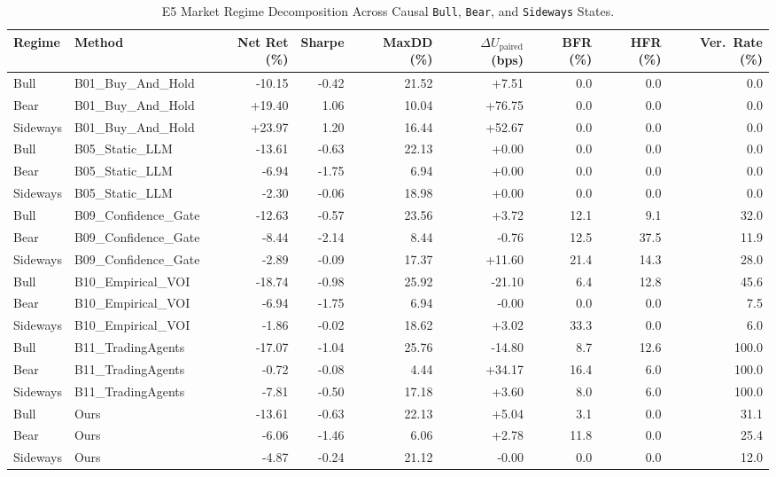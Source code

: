 \begin{table}[t]
\centering
\caption{E5 Market Regime Decomposition Across Causal \texttt{Bull}, \texttt{Bear}, and \texttt{Sideways} States.}
\label{tab:e5_market_regimes}
\footnotesize
\begin{tabular}{llrrrrrrr}
\toprule
Regime & Method & Net Ret (\%) & Sharpe & MaxDD (\%) & $\Delta U_{\text{paired}}$ (bps) & BFR (\%) & HFR (\%) & Ver.\ Rate (\%) \\
\midrule
Bull & B01\_Buy\_And\_Hold & -10.15 & -0.42 & 21.52 & +7.51 & 0.0 & 0.0 & 0.0 \\
Bear & B01\_Buy\_And\_Hold & +19.40 & 1.06 & 10.04 & +76.75 & 0.0 & 0.0 & 0.0 \\
Sideways & B01\_Buy\_And\_Hold & +23.97 & 1.20 & 16.44 & +52.67 & 0.0 & 0.0 & 0.0 \\
Bull & B05\_Static\_LLM & -13.61 & -0.63 & 22.13 & +0.00 & 0.0 & 0.0 & 0.0 \\
Bear & B05\_Static\_LLM & -6.94 & -1.75 & 6.94 & +0.00 & 0.0 & 0.0 & 0.0 \\
Sideways & B05\_Static\_LLM & -2.30 & -0.06 & 18.98 & +0.00 & 0.0 & 0.0 & 0.0 \\
Bull & B09\_Confidence\_Gate & -12.63 & -0.57 & 23.56 & +3.72 & 12.1 & 9.1 & 32.0 \\
Bear & B09\_Confidence\_Gate & -8.44 & -2.14 & 8.44 & -0.76 & 12.5 & 37.5 & 11.9 \\
Sideways & B09\_Confidence\_Gate & -2.89 & -0.09 & 17.37 & +11.60 & 21.4 & 14.3 & 28.0 \\
Bull & B10\_Empirical\_VOI & -18.74 & -0.98 & 25.92 & -21.10 & 6.4 & 12.8 & 45.6 \\
Bear & B10\_Empirical\_VOI & -6.94 & -1.75 & 6.94 & -0.00 & 0.0 & 0.0 & 7.5 \\
Sideways & B10\_Empirical\_VOI & -1.86 & -0.02 & 18.62 & +3.02 & 33.3 & 0.0 & 6.0 \\
Bull & B11\_TradingAgents & -17.07 & -1.04 & 25.76 & -14.80 & 8.7 & 12.6 & 100.0 \\
Bear & B11\_TradingAgents & -0.72 & -0.08 & 4.44 & +34.17 & 16.4 & 6.0 & 100.0 \\
Sideways & B11\_TradingAgents & -7.81 & -0.50 & 17.18 & +3.60 & 8.0 & 6.0 & 100.0 \\
Bull & Ours & -13.61 & -0.63 & 22.13 & +5.04 & 3.1 & 0.0 & 31.1 \\
Bear & Ours & -6.06 & -1.46 & 6.06 & +2.78 & 11.8 & 0.0 & 25.4 \\
Sideways & Ours & -4.87 & -0.24 & 21.12 & -0.00 & 0.0 & 0.0 & 12.0 \\
\bottomrule
\end{tabular}
\end{table}
